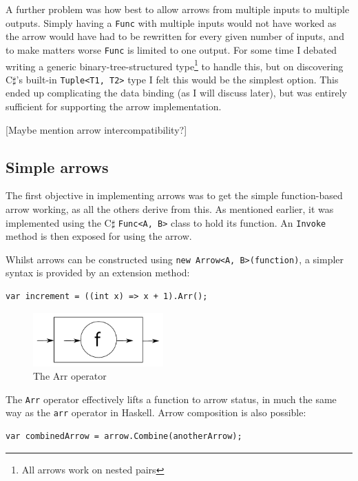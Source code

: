 \documentclass[12pt,twoside,notitlepage]{report}
\begin{document}
A further problem was how best to allow arrows from multiple inputs to multiple outputs. Simply having a \texttt{Func} with multiple inputs would not have worked as the arrow would have had to be rewritten for every given number of inputs, and to make matters worse \texttt{Func} is limited to one output. For some time I debated writing a generic binary-tree-structured type\footnote{All arrows work on nested pairs} to handle this, but on discovering C$\sharp$'s built-in \texttt{Tuple<T1, T2>} type I felt this would be the simplest option. This ended up complicating the data binding (as I will discuss later), but was entirely sufficient for supporting the arrow implementation.

[Maybe mention arrow intercompatibility?]

\subsection{Simple arrows}

The first objective in implementing arrows was to get the simple function-based arrow working, as all the others derive from this. As mentioned earlier, it was implemented using the C$\sharp$ \texttt{Func<A, B>} class to hold its function. An \texttt{Invoke} method is then exposed for using the arrow.

Whilst arrows can be constructed using \texttt{new Arrow<A, B>(function)}, a simpler syntax is provided by an extension method:

\begin{lstlisting}[language={[Sharp]C}]
var increment = ((int x) => x + 1).Arr();
\end{lstlisting}

\begin{figure}[!ht]
  \centering
  \includegraphics[width=50mm]{fig/ArrOperator.pdf}
  \caption{The Arr operator}
  \label{fig:arr_operator}
\end{figure}

The \texttt{Arr} operator effectively lifts a function to arrow status, in much the same way as the \texttt{arr} operator in Haskell. Arrow composition is also possible:

\begin{lstlisting}[language={[Sharp]C}]
var combinedArrow = arrow.Combine(anotherArrow);
\end{lstlisting}
\end{document}

